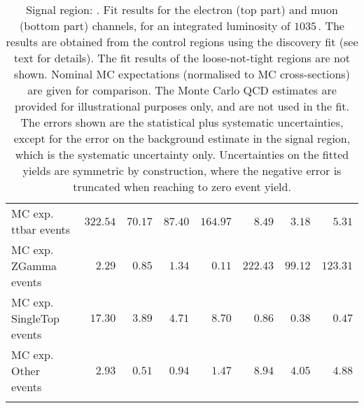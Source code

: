 \begin{table}
\begin{center}
{\begin{tabular*}{\textwidth}{@{\extracolsep{\fill}}lrrrrrrr}
\noalign{\smallskip}\hline\noalign{\smallskip}
        MC exp. ttbar events         & $322.54$          & $70.17$          & $87.40$          & $164.97$          & $8.49$          & $3.18$          & $5.31$              \\
        MC exp. ZGamma events         & $2.29$          & $0.85$          & $1.34$          & $0.11$          & $222.43$          & $99.12$          & $123.31$              \\
        MC exp. SingleTop events         & $17.30$          & $3.89$          & $4.71$          & $8.70$          & $0.86$          & $0.38$          & $0.47$              \\
        MC exp. Other events         & $2.93$          & $0.51$          & $0.94$          & $1.47$          & $8.94$          & $4.05$          & $4.88$              \\
\noalign{\smallskip}\hline\noalign{\smallskip}
\end{tabular*}
}
\end{center}
\caption{Signal region: . Fit results for the electron (top part) and muon (bottom part) channels, for an integrated luminosity of $1035$\,\ipb.
The results are obtained from the control regions using the discovery fit (see text for details). The fit results of the loose-not-tight regions are not shown.
Nominal MC expectations (normalised to MC cross-sections) are given for comparison. 
The Monte Carlo QCD estimates are provided for illustrational purposes only, and are not used in the fit.
The errors shown are the statistical plus systematic uncertainties, except for the error on the background estimate in the signal region, which is the systematic uncertainty only.
Uncertainties on the fitted yields are symmetric by construction, 
where the negative error is truncated when reaching to zero event yield.
}
\label{table.results.systematics.in.logL.fit.table.results.yields}
\end{table}
%